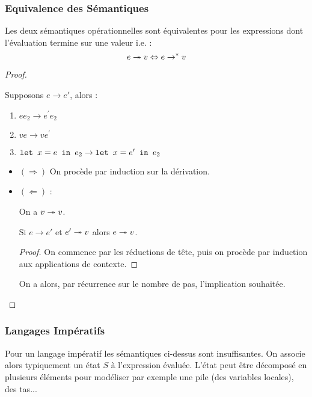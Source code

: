 \documentclass{cours}
\begin{document}
\subsubsection{Equivalence des Sémantiques}
\begin{theorem}
    Les deux sémantiques opérationnelles sont équivalentes pour les expressions dont l'évaluation termine sur une valeur i.e. :
    \[
        e \twoheadrightarrow v \Leftrightarrow e \rightarrow^{*} v
    \]
\end{theorem}
\begin{proof}
    \begin{lemma}
        Supposons $e \rightarrow e'$, alors :
        \begin{enumerate}
            \item $e e_{2} \rightarrow e^{'} e_{2}$
            \item $v e \rightarrow v e^{'}$
            \item $\texttt{let } x = e \texttt{ in } e_{2} \rightarrow \texttt{let } x = e' \texttt{ in } e_{2}$
        \end{enumerate}
    \end{lemma}
    \begin{itemize}
        \item $(\Rightarrow)$ On procède par induction sur la dérivation.
        \item $(\Leftarrow)$ :
              \begin{lemma}
                  On a $v \twoheadrightarrow v$.
              \end{lemma}
              \begin{lemma}
                  Si $e \rightarrow e'$ et $e' \twoheadrightarrow v$ alors $e \twoheadrightarrow v$.
              \end{lemma}
              \begin{proof}
                  On commence par les réductions de tête, puis on procède par induction aux applications de contexte.
              \end{proof}
              On a alors, par récurrence sur le nombre de pas, l'implication souhaitée.
    \end{itemize}
\end{proof}

\subsubsection{Langages Impératifs}
Pour un langage impératif les sémantiques ci-dessus sont insuffisantes. On associe alors typiquement un état $S$ à l'expression évaluée. L'état peut être décomposé en plusieurs éléments pour modéliser par exemple une pile (des variables locales), des tas...
\end{document}
